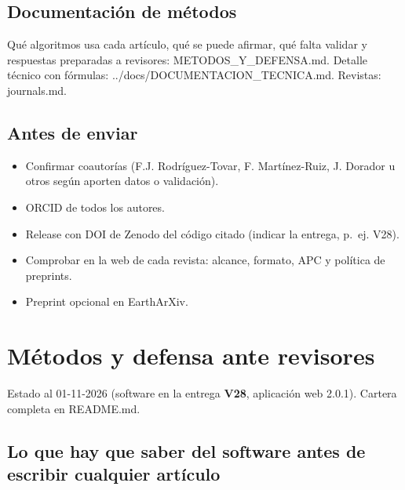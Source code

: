 \documentclass[
  10pt,
]{article}
\providecommand{\tightlist}{%
  \setlength{\itemsep}{0pt}\setlength{\parskip}{0pt}}
\begin{document}
\hypertarget{documentaciuxf3n-de-muxe9todos}{%
\subsection{Documentación de
métodos}\label{documentaciuxf3n-de-muxe9todos}}

Qué algoritmos usa cada artículo, qué se puede afirmar, qué falta
validar y respuestas preparadas a revisores: METODOS\_Y\_DEFENSA.md.
Detalle técnico con fórmulas: ../docs/DOCUMENTACION\_TECNICA.md.
Revistas: journals.md.

\hypertarget{antes-de-enviar}{%
\subsection{Antes de enviar}\label{antes-de-enviar}}

\begin{itemize}
\tightlist
\item
  Confirmar coautorías (F.J. Rodríguez-Tovar, F. Martínez-Ruiz, J.
  Dorador u otros según aporten datos o validación).
\item
  ORCID de todos los autores.
\item
  Release con DOI de Zenodo del código citado (indicar la entrega,
  p.~ej. V28).
\item
  Comprobar en la web de cada revista: alcance, formato, APC y política
  de preprints.
\item
  Preprint opcional en EarthArXiv.
\end{itemize}

\newpage

\hypertarget{muxe9todos-y-defensa-ante-revisores}{%
\section{Métodos y defensa ante
revisores}\label{muxe9todos-y-defensa-ante-revisores}}

Estado al 01-11-2026 (software en la entrega \textbf{V28}, aplicación
web 2.0.1). Cartera completa en README.md.

\hypertarget{lo-que-hay-que-saber-del-software-antes-de-escribir-cualquier-artuxedculo}{%
\subsection{Lo que hay que saber del software antes de escribir
cualquier
artículo}\label{lo-que-hay-que-saber-del-software-antes-de-escribir-cualquier-artuxedculo}}
\end{document}
